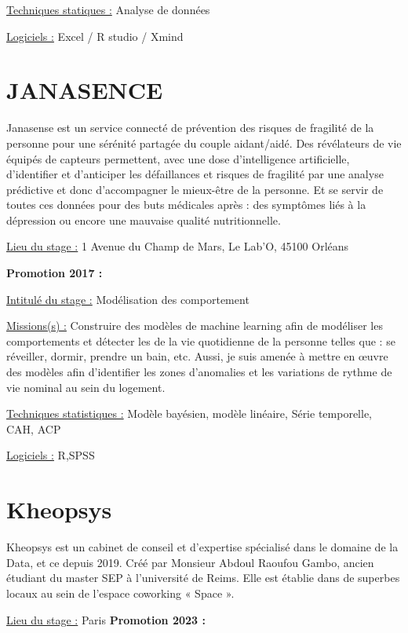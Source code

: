 \documentclass[
  letterpaper,
  DIV=11,
  numbers=noendperiod]{scrreprt}
\begin{document}
\uline{Techniques statiques :} Analyse de données

\uline{Logiciels :} Excel / R studio / Xmind

\hypertarget{janasence}{%
\section{\texorpdfstring{\textbf{JANASENCE}}{JANASENCE}}\label{janasence}}

Janasense est un service connecté de prévention des risques de fragilité
de la personne pour une sérénité partagée du couple aidant/aidé. Des
révélateurs de vie équipés de capteurs permettent, avec une dose
d'intelligence artificielle, d'identifier et d'anticiper les
défaillances et risques de fragilité par une analyse prédictive et donc
d'accompagner le mieux-être de la personne. Et se servir de toutes ces
données pour des buts médicales après : des symptômes liés à la
dépression ou encore une mauvaise qualité nutritionnelle.

\uline{Lieu du stage :} 1 Avenue du Champ de Mars, Le Lab'O, 45100
Orléans

\textbf{Promotion 2017 :}

\uline{Intitulé du stage :} Modélisation des comportement

\uline{Missions(s) :} Construire des modèles de machine learning afin de
modéliser les comportements et détecter les de la vie quotidienne de la
personne telles que : se réveiller, dormir, prendre un bain, etc. Aussi,
je suis amenée à mettre en œuvre des modèles afin d'identifier les zones
d'anomalies et les variations de rythme de vie nominal au sein du
logement.

\uline{Techniques statistiques :} Modèle bayésien, modèle linéaire,
Série temporelle, CAH, ACP

\uline{Logiciels :} R,SPSS

\hypertarget{kheopsys}{%
\section{\texorpdfstring{\textbf{Kheopsys}}{Kheopsys}}\label{kheopsys}}

Kheopsys est un cabinet de conseil et d'expertise spécialisé dans le
domaine de la Data, et ce depuis 2019. Créé par Monsieur Abdoul Raoufou
Gambo, ancien étudiant du master SEP à l'université de Reims. Elle est
établie dans de superbes locaux au sein de l'espace coworking « Space ».

\uline{Lieu du stage :} Paris \textbf{Promotion 2023 :}
\end{document}
